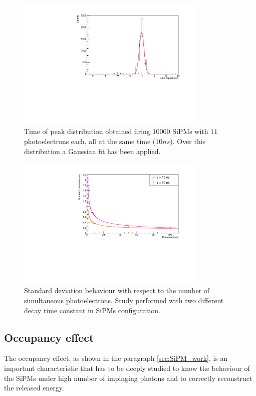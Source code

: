 \begin{figure}
	\centering
	\includegraphics[width=0.8\textwidth]{IMG/Cap5/Dummy11pe_50ns}
	\caption{Time of peak distribution obtained firing $10000$ SiPMs with $11$ photoelectrons each, all at the same time ($10 ns$). Over this distribution a Gaussian fit has been applied.}
	\label{fig:top_dummy}
\end{figure}

\begin{figure}
	\centering
	\includegraphics[width=0.8\textwidth]{IMG/Cap5/PeakSpread}
	\caption{Standard deviation behaviour with respect to the number of simultaneous photoelectrons. Study performed with two different decay time constant in SiPMs configuration.}
	\label{fig:top_sigma}
\end{figure}


\subsection{Occupancy effect} \label{subsec:Sat_effect}
The occupancy effect, as shown in the paragraph \ref{sec:SiPM_work}, is an important characteristic that has to be deeply studied to know the behaviour of the SiPMs under high number of impinging photons and to correctly reconstruct the released energy.\\

